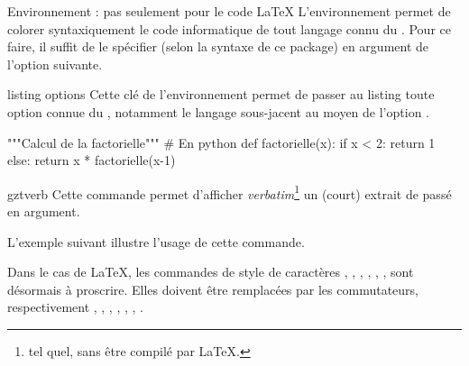 \begin{dbremark}{Environnement \protect{} : pas seulement pour le
    code \LaTeX{}}{}
  L'environnement  permet de colorer syntaxiquement le code
  informatique de tout langage connu du . Pour ce faire, il
  suffit de le spécifier (selon la syntaxe de ce package) en argument de
  l'option  suivante.
\end{dbremark}

\begin{docKey}{listing options}{}{}
  Cette clé de l'environnement  permet de passer au listing
  toute option connue du , notamment le langage sous-jacent
  au moyen de l'option .
\end{docKey}

\begin{bodycode}[listing and text,listing options={deletekeywords={listing,[2]style}}]
%
  \begin{gztcode}[listing options={style=mon-style}]
    """Calcul de la factorielle""" # En python def factorielle(x): if x < 2:
    return 1 else: return x * factorielle(x-1)
  \end{gztcode}
\end{bodycode}

\begin{docCommand}{gztverb}{}
  Cette commande permet d'afficher \emph{verbatim}\footnote{\Cad*{} tel quel,
    sans être compilé par \LaTeX{}.} un (court) extrait de  passé en
  argument.
\end{docCommand}
L'exemple suivant illustre l'usage de cette commande\conseilslatex.

\begin{bodycode}[listing and text,colback=white,listing options={deletekeywords={[2]style}}]
  Dans le cas de \LaTeX, les commandes de style de caractères \gztverb{\bf},
  \gztverb{\it}, \gztverb{\sf}, \gztverb{\tt}, \gztverb{\sc}, \gztverb{\sl},
  \gztverb{\rm} sont désormais à proscrire. Elles doivent être remplacées par
  les commutateurs, respectivement \gztverb{\bfseries}, \gztverb {\itshape},
  \gztverb{\sffamily}, \gztverb{\ttfamily}, \gztverb{\scshape},
  \gztverb{\slshape}, \gztverb{\rmfamily}.
\end{bodycode}

